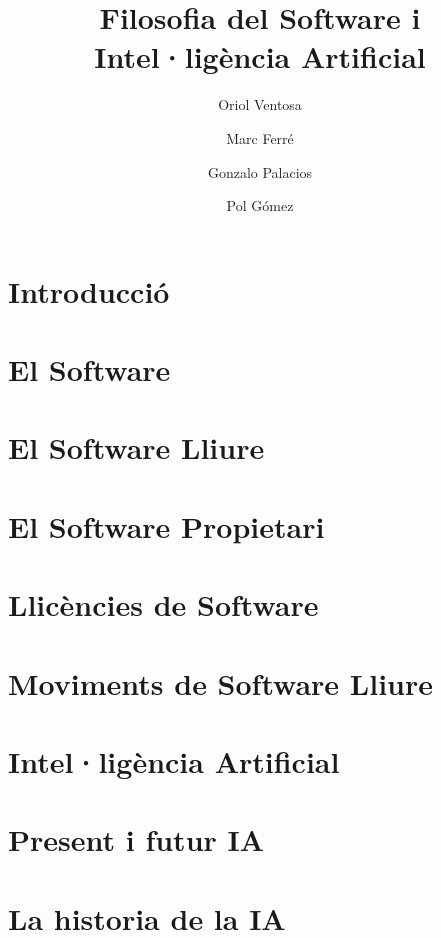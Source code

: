 \documentclass[a4paper,12pt]{report}
\date{}
\begin{document}


\title{
	{\bf Filosofia del Software i Intel·ligència Artificial}
}
\author{
	Oriol Ventosa \and
	Marc Ferré \and
	Gonzalo Palacios \and
	Pol Gómez
}

\maketitle

\tableofcontents

\chapter{Introducció}


\chapter{El Software}


\chapter{El Software Lliure}


\chapter{El Software Propietari}


\chapter{Llicències de Software}


\chapter{Moviments de Software Lliure}


\chapter{Intel·ligència Artificial}


\chapter{Present i futur IA}


\chapter{La historia de la IA}




\end{document}
